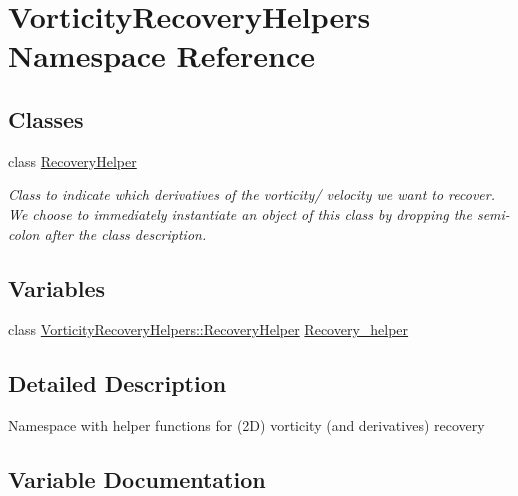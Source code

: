 \hypertarget{namespaceVorticityRecoveryHelpers}{}\section{Vorticity\+Recovery\+Helpers Namespace Reference}
\label{namespaceVorticityRecoveryHelpers}
\subsection*{Classes}
\begin{DoxyCompactItemize}
\item 
class \hyperlink{classVorticityRecoveryHelpers_1_1RecoveryHelper}{Recovery\+Helper}
\begin{DoxyCompactList}\small\item\em Class to indicate which derivatives of the vorticity/ velocity we want to recover. We choose to immediately instantiate an object of this class by dropping the semi-\/colon after the class description. \end{DoxyCompactList}\end{DoxyCompactItemize}
\subsection*{Variables}
\begin{DoxyCompactItemize}
\item 
class \hyperlink{classVorticityRecoveryHelpers_1_1RecoveryHelper}{Vorticity\+Recovery\+Helpers\+::\+Recovery\+Helper} \hyperlink{namespaceVorticityRecoveryHelpers_a699a0ecf8f71305987b8c00cccedcb53}{Recovery\+\_\+helper}
\end{DoxyCompactItemize}


\subsection{Detailed Description}
Namespace with helper functions for (2D) vorticity (and derivatives) recovery 

\subsection{Variable Documentation}
\mbox{\label{namespaceVorticityRecoveryHelpers_a699a0ecf8f71305987b8c00cccedcb53}} 
